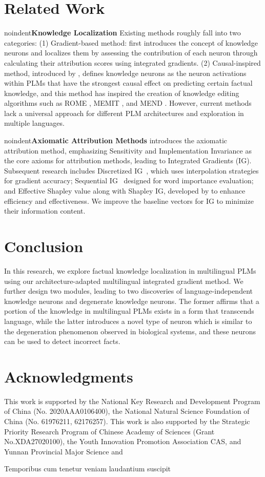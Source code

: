 \documentclass[]{article}
\newcommand{\vpara}[1]{noindent\textbf{#1 }}%
\begin{document}
\section{Related Work}
\vpara{Knowledge Localization}
Existing methods roughly fall into two categories: (1) Gradient-based method: \citeauthor{dai2022kn} first introduces the concept of knowledge neurons and localizes them by assessing the contribution of each neuron \cite{key_value} through calculating their attribution scores using integrated gradients. (2) Causal-inspired method, introduced by \citeauthor{meng2022locating}, defines knowledge neurons as the neuron activations within PLMs that have the strongest causal effect on predicting certain factual knowledge, and this method has inspired the creation of knowledge editing algorithms such as ROME \cite{meng2022locating}, MEMIT \cite{meng2022memit}, and MEND \cite{mend}. However, current methods lack a universal approach for different PLM architectures and exploration in multiple languages.

\vpara{Axiomatic Attribution Methods}
\citeauthor{ig} introduces the axiomatic attribution method, emphasizing Sensitivity and Implementation Invariance as the core axioms for attribution methods, leading to Integrated Gradients (IG). Subsequent research includes Discretized IG~\cite{DIG}, which uses interpolation strategies for gradient accuracy; Sequential IG~\cite{enguehard2023sequential} designed for word importance evaluation; and Effective Shapley value along with Shapley IG, developed by \citeauthor{transparent} to enhance efficiency and effectiveness. We improve the baseline vectors for IG to minimize their information content.

\section{Conclusion}
In this research, we explore factual knowledge localization in multilingual PLMs using our architecture-adapted multilingual integrated gradient method. We further design two modules, leading to two discoveries of language-independent knowledge neurons and degenerate knowledge neurons. The former affirms that a portion of the knowledge in multilingual PLMs exists in a form that transcends language, while the latter introduces a novel type of neuron which is similar to the degeneration phenomenon observed in biological systems, and these neurons can be used to detect incorrect facts.

\section*{Acknowledgments}
This work is supported by the National Key Research and Development Program of China (No. 2020AAA0106400), the National Natural Science Foundation of China (No. 61976211, 62176257). This work is also supported by the Strategic Priority Research Program of Chinese Academy of Sciences (Grant No.XDA27020100), the Youth Innovation Promotion Association CAS, and Yunnan Provincial Major Science and

Temporibus cum tenetur veniam laudantium suscipit

\end{document}
